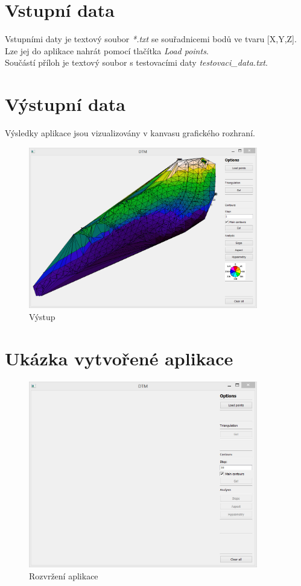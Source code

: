 \documentclass[a4paper, 12pt]{article}
\begin{document}
\clearpage


\section{Vstupní data}

Vstupními daty je textový soubor \textit{*.txt} se souřadnicemi bodů ve tvaru [X,Y,Z]. Lze jej do aplikace nahrát pomocí tlačítka \textit{Load points}.\\

\noindent Součástí příloh je textový soubor s testovacími daty \textit{testovaci\_data.txt}.

\vspace{4.5cm}

\section{Výstupní data}
Výsledky aplikace jsou vizualizovány v kanvasu grafického rozhraní.

\begin{figure}[h]
	\centering
	\includegraphics[width=10cm]{hypsometrie.jpg}
	\caption{Výstup}
\end{figure}

\clearpage

\section{Ukázka vytvořené aplikace}


\begin{figure}[h]
	\centering
	\includegraphics[width=10cm]{aplikace.jpg}
	\caption{Rozvržení aplikace}
\end{figure}
\end{document}
